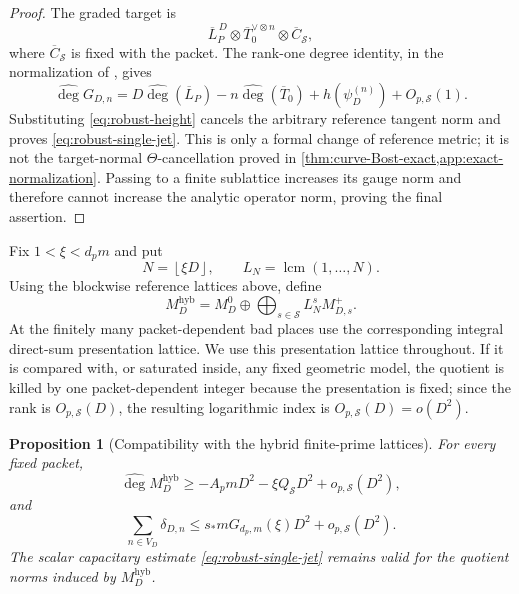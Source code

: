 \documentclass[11pt]{article}
\newtheorem{proposition}[proposition]{Proposition}
\theoremstyle{definition}
\theoremstyle{remark}
\newcommand{\lcmop}{\operatorname{lcm}}
\newcommand{\widehatdeg}{\widehat{\deg}}
\newcommand{\floor}[1]{\left\lfloor #1\right\rfloor}
\begin{document}
\begin{proof}
The graded target is
\[
 \overline L_P^{\,D}\otimes
 \overline T_0^{\vee\otimes n}\otimes\overline C_{\mathcal S},
\]
where $\overline C_{\mathcal S}$ is fixed with the packet.  The rank-one degree
identity, in the normalization of
\cite[Theorem~6.1, (6.7)]{BostChambertLoir2009}, gives
\[
 \widehatdeg G_{D,n}
 =D\widehatdeg(\overline L_P)
  -n\widehatdeg(\overline T_0)
  +h(\psi_D^{(n)})+O_{p,\mathcal S}(1).
\]
Substituting \eqref{eq:robust-height} cancels the arbitrary reference tangent
norm and proves \eqref{eq:robust-single-jet}.  This is only a formal change of
reference metric; it is not the target-normal $\Theta$-cancellation proved
in \cref{thm:curve-Bost-exact,app:exact-normalization}.  Passing to a finite sublattice increases its gauge norm and
therefore cannot increase the analytic operator norm, proving the final
assertion.
\end{proof}

Fix $1<\xi<d_pm$ and put
\[
 N=\floor{\xi D},\qquad L_N=\lcmop(1,\ldots,N).
\]
Using the blockwise reference lattices above, define
\begin{equation}\label{eq:curve-hybrid-lattice}
 M_D^{\mathrm{hyb}}=
 M_D^0\oplus\bigoplus_{s\in\mathcal S}L_N^sM_{D,s}^+.
\end{equation}
At the finitely many packet-dependent bad places use the corresponding
integral direct-sum presentation lattice.  We use this presentation lattice
throughout.  If it is compared with, or saturated inside, any fixed geometric
model, the quotient is killed by one packet-dependent integer because the
presentation is fixed; since the rank is $O_{p,\mathcal S}(D)$, the resulting
logarithmic index is $O_{p,\mathcal S}(D)=o(D^2)$.

\begin{proposition}[Compatibility with the hybrid finite-prime lattices]
\label{prop:curve-hybrid-compatibility}
For every fixed packet,
\begin{equation}\label{eq:curve-hybrid-degree}
 \widehatdeg M_D^{\mathrm{hyb}}
 \ge-A_pmD^2-\xi Q_{\mathcal S}D^2
       +o_{p,\mathcal S}(D^2),
\end{equation}
and
\begin{equation}\label{eq:curve-hybrid-delta}
 \sum_{n\in V_D}\delta_{D,n}
 \le s_*mG_{d_p,m}(\xi)D^2+o_{p,\mathcal S}(D^2).
\end{equation}
The scalar capacitary estimate \eqref{eq:robust-single-jet} remains valid for
the quotient norms induced by $M_D^{\mathrm{hyb}}$.
\end{proposition}
\end{document}
